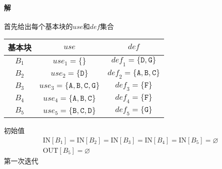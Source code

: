 \documentclass{article}
\begin{document}
\paragraph{解}
首先给出每个基本块的$\textit{use}$和$\textit{def}$集合
\begin{table}[H]
    \centering
    \begin{tabular}{|c|c|c|}
    \hline
    基本块 & $\textit{use}$ & $\textit{def}$ \\ \hline
    $B_1$ & $\textit{use}_1 = \{\}$ & $\textit{def}_1 = \{\texttt{D},\texttt{G}\}$ \\ \hline
    $B_2$ & $\textit{use}_2 = \{\texttt{D}\}$ & $\textit{def}_2 = \{\texttt{A},\texttt{B},\texttt{C}\}$ \\ \hline
    $B_3$ & $\textit{use}_3 = \{\texttt{A},\texttt{B},\texttt{C},\texttt{G}\}$ & $\textit{def}_3 = \{\texttt{F}\}$ \\ \hline
    $B_4$ & $\textit{use}_4 = \{\texttt{A},\texttt{B},\texttt{C}\}$ & $\textit{def}_4 = \{\texttt{F}\}$ \\ \hline
    $B_5$ & $\textit{use}_5 = \{\texttt{B},\texttt{C},\texttt{D}\}$ & $\textit{def}_5 = \{\texttt{G}\}$ \\ \hline
    \end{tabular}
\end{table}
初始值
\begin{align*}
   & \text{IN}[B_1] = \text{IN}[B_2] = \text{IN}[B_3] = \text{IN}[B_4] = \text{IN}[B_5] = \varnothing \\
   & \text{OUT}[B_5] = \varnothing
\end{align*}
第一次迭代
\end{document}
